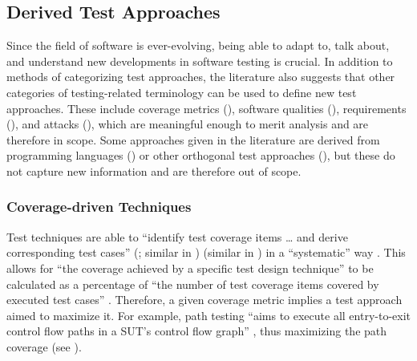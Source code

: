     \subsection{Derived Test Approaches}
    \label{derived-tests}

    Since the field of software is ever-evolving, being able to adapt to,
    talk about, and understand new developments in software testing is
    crucial. In addition to methods of categorizing test approaches, the
    literature also suggests that other categories of testing-related
    terminology can be used to define new test approaches. These include
    coverage metrics (), software qualities (),
    requirements (), and attacks (), which are
    meaningful enough to merit analysis and are therefore in scope. Some
    approaches given in the literature are derived from programming languages
    () or other orthogonal test approaches
    (), but these do not capture new information and are
    therefore out of scope.

    \subsubsection{Coverage-driven Techniques}
    \label{cov-test}

    Test techniques are able to ``identify test coverage items \dots{} and
    derive corresponding test cases''
    \ifnotpaper
        (\citealp[p.~11]{IEEE2022}; similar in \citeyear[p.~467]{IEEE2017})
    \else
        \cite[p.~11]{IEEE2022} (similar in \cite[p.~467]{IEEE2017})
    \fi
    in a ``systematic'' way
    \citeyearpar[p.~464]{IEEE2017}.
    \ifnotpaper
        This allows for ``the coverage achieved by a specific test design
        technique'' to be calculated as a percentage of ``the number of test
        coverage items covered by executed test cases'' \citeyearpar[p.~30]{IEEE2021}.
    \fi %
    Therefore, a given coverage metric implies a test approach aimed to
    maximize it. For example, path testing ``aims to execute all entry-to-exit
    control flow paths in a SUT's control flow graph'' \citep[p.~5013]{SWEBOK2024},
    thus maximizing the path coverage
    \ifnotpaper
        \citep[see][Fig.~1]{SharmaEtAl2021}\else
        (see \cite[Fig.~1]{SharmaEtAl2021})\fi.

